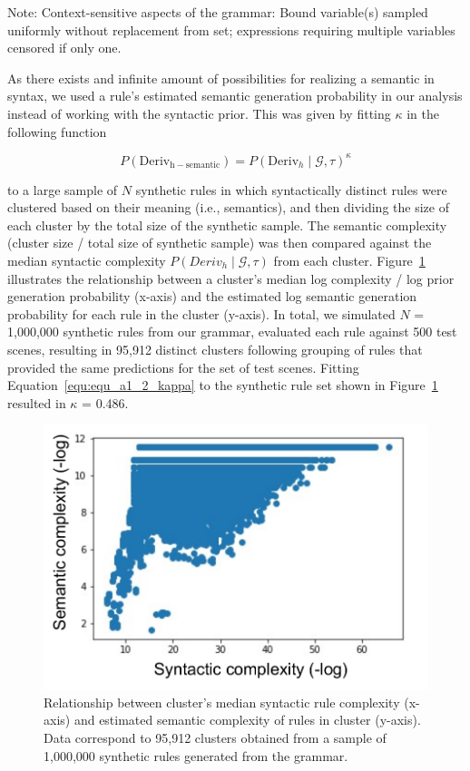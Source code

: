 \documentclass[doc,natbib,floatsintext]{apa7}
\begin{document}
\begin{appendices}
\begin{table}[H]
{\raggedright Note: Context-sensitive aspects of the grammar: Bound variable(s) sampled uniformly without replacement from set; expressions requiring multiple variables censored if only one. 
}
\end{table}

As there exists and infinite amount of possibilities for realizing a semantic in syntax, we used a rule's estimated semantic generation probability in our analysis instead of working with the syntactic prior. This was given by fitting $\kappa$ in the following function

\begin{equation}
    P(\mathrm{Deriv}_{\mathrm{h-semantic}}) = P(\mathrm{Deriv}_{h}\mid\mathcal{G},\tau)^{\kappa}
\label{equ:equ_a1_2_kappa}
\end{equation}

to a large sample of $N$ synthetic rules in which syntactically distinct rules were clustered based on their meaning (i.e., semantics), and then dividing the size of each cluster by the total size of the synthetic sample. The semantic complexity (cluster size / total size of synthetic sample) was then compared against the median syntactic complexity $P(Deriv_{h}\mid\mathcal{G},\tau)$ from each cluster. Figure~\ref{fig:fig_a1_1_semantic_deriv_prob} illustrates the relationship between a cluster's median log complexity / log prior generation probability (x-axis) and the estimated log semantic generation probability for each rule in the cluster (y-axis). In total, we simulated $N$ = 1,000,000 synthetic rules from our grammar, evaluated each rule against 500 test scenes, resulting in 95,912 distinct clusters following grouping of rules that provided the same predictions for the set of test scenes. Fitting Equation~\ref{equ:equ_a1_2_kappa} to the synthetic rule set shown in Figure~\ref{fig:fig_a1_1_semantic_deriv_prob} resulted in $\kappa$ =  0.486. 




\begin{figure}[t]
    \begin{center}
      \includegraphics[width=.5\textwidth]{img/fig_a1_semantic_deriv_prob.pdf}
    \end{center}
    \caption{Relationship between cluster's median syntactic rule complexity (x-axis) and estimated semantic complexity of rules in cluster (y-axis). Data correspond to 95,912 clusters obtained from a sample of 1,000,000 synthetic rules generated from the grammar.}
    \label{fig:fig_a1_1_semantic_deriv_prob}
\end{figure}




\end{appendices}
\end{document}
